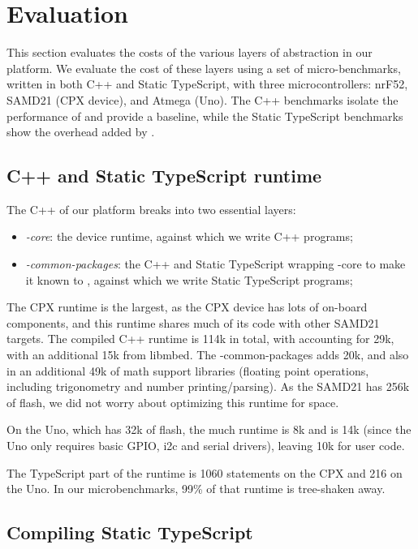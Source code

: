 \section{Evaluation}
\label{sec:evaluate}

This section evaluates the costs of the various layers of abstraction in our platform.
We evaluate the cost of these layers using a set of micro-benchmarks, written
in both C++ and Static TypeScript, with three microcontrollers: nrF52, 
SAMD21 (CPX device), and Atmega (Uno). The C++ benchmarks isolate the performance
of \CO and provide a baseline, while the Static TypeScript benchmarks show the overhead
added by \MC. 

\subsection{C++ and Static TypeScript runtime}
The C++ of our platform breaks into two essential layers:
\begin{itemize}
\item \emph{\CON-core}: the \CO device runtime, against which we write C++ programs;
\item \emph{\MCN-common-packages}: the C++ and Static TypeScript wrapping \CON-core 
to make it known to \MC, against which we write Static TypeScript programs;
\end{itemize}

The CPX runtime is the largest, as the CPX device has lots of on-board
components, and this runtime shares much of its code with other SAMD21 \MC targets.
The compiled C++ runtime is 114k in total, with \CO accounting for 29k, with an
additional 15k from libmbed. The \MCN-common-packages adds 20k, and also in
an additional 49k of math support libraries (floating point operations,
including trigonometry and number printing/parsing).
As the SAMD21 has 256k of flash, we did not worry about optimizing this runtime for space.

On the Uno, which has 32k of flash, the much \MC runtime is 8k and \CO is 14k (since
the Uno only requires basic GPIO, i2c and serial drivers), leaving 10k for user code. 

The TypeScript part of the runtime is 1060 statements on the CPX and 216 on the Uno.
In our microbenchmarks, 99\% of that runtime is tree-shaken away.

\subsection{Compiling Static TypeScript}

